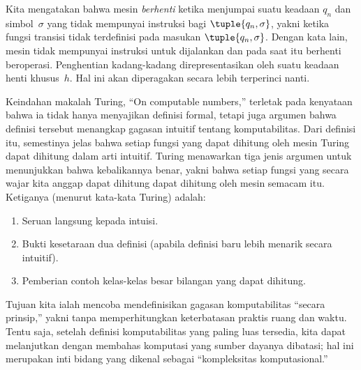 \documentclass[../../../include/open-logic-section]{subfiles}
\begin{document}
\begin{explain}
Kita mengatakan bahwa mesin \emph{berhenti} ketika menjumpai suatu keadaan
$q_n$ dan simbol~$\sigma$ yang tidak mempunyai instruksi bagi
$\tuple{q_n, \sigma}$, yakni ketika fungsi transisi tidak terdefinisi pada
masukan $\tuple{q_n,\sigma}$. Dengan kata lain, mesin tidak mempunyai instruksi
untuk dijalankan dan pada saat itu berhenti beroperasi. Penghentian kadang-kadang
direpresentasikan oleh suatu keadaan henti khusus~$h$. Hal ini akan diperagakan
secara lebih terperinci nanti.
\end{explain}

\begin{digress}
Keindahan makalah Turing, ``On computable numbers,'' terletak pada kenyataan
bahwa ia tidak hanya menyajikan definisi formal, tetapi juga argumen bahwa
definisi tersebut menangkap gagasan intuitif tentang komputabilitas. Dari
definisi itu, semestinya jelas bahwa setiap fungsi yang dapat dihitung oleh
mesin Turing dapat dihitung dalam arti intuitif. Turing menawarkan tiga jenis
argumen untuk menunjukkan bahwa kebalikannya benar, yakni bahwa setiap fungsi
yang secara wajar kita anggap dapat dihitung dapat dihitung oleh mesin semacam
itu. Ketiganya (menurut kata-kata Turing) adalah:
\begin{enumerate}
\item Seruan langsung kepada intuisi.
\item Bukti kesetaraan dua definisi (apabila definisi baru lebih menarik secara
  intuitif).
\item Pemberian contoh kelas-kelas besar bilangan yang dapat dihitung.
\end{enumerate}
Tujuan kita ialah mencoba mendefinisikan gagasan komputabilitas ``secara
prinsip,'' yakni tanpa memperhitungkan keterbatasan praktis ruang dan waktu.
Tentu saja, setelah definisi komputabilitas yang paling luas tersedia, kita
dapat melanjutkan dengan membahas komputasi yang sumber dayanya dibatasi; hal
ini merupakan inti bidang yang dikenal sebagai ``kompleksitas komputasional.''
\end{digress}
\end{document}
